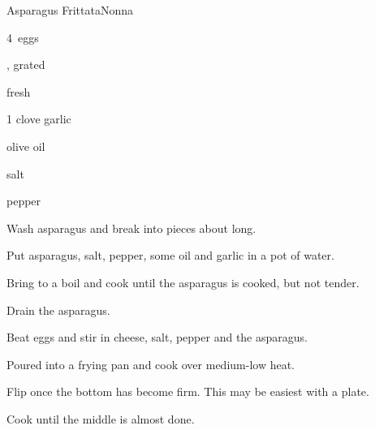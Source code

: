 \begin{recipe}{Asparagus Frittata}{Nonna}{}

\begin{ingredients}
\item 4~eggs
\item {}, grated
\item \C{1 \half} fresh 
\item 1 clove garlic
\item olive oil
\item salt
\item pepper
\end{ingredients}

\begin{directions}
\item Wash asparagus and break into pieces about  long.
\item Put asparagus, salt, pepper, some oil and garlic in a pot of water.
\item Bring to a boil and cook until the asparagus is cooked, but not tender.
\item Drain the asparagus.
\item Beat eggs and stir in cheese, salt, pepper and the asparagus.
\item Poured into a frying pan and cook over medium-low heat.
\item Flip once the bottom has become firm. This may be easiest with a plate.
\item Cook until the middle is almost done.
\end{directions}

\end{recipe}
